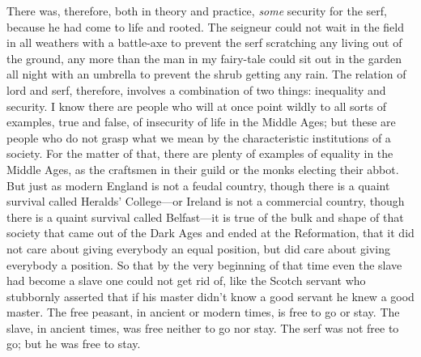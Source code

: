 \documentclass{book}
\begin{document}
There was, therefore, both in theory and practice, \emph{some} security for the serf, because he had come to life and rooted. The seigneur could not wait in the field in all weathers with a battle-axe to prevent the serf scratching any living out of the ground, any more than the man in my fairy-tale could sit out in the garden all night with an umbrella to prevent the shrub getting any rain. The relation of lord and serf, therefore, involves a combination of two things: inequality and security. I know there are people who will at once point wildly to all sorts of examples, true and false, of insecurity of life in the Middle Ages; but these are people who do not grasp what we mean by the characteristic institutions of a society. For the matter of that, there are plenty of examples of equality in the Middle Ages, as the craftsmen in their guild or the monks electing their abbot. But just as modern England is not a feudal country, though there is a quaint survival called Heralds’ College—or Ireland is not a commercial country, though there is a quaint survival called Belfast—it is true of the bulk and shape of that society that came out of the Dark Ages and ended at the Reformation, that it did not care about giving everybody an equal position, but did care about giving everybody a position. So that by the very beginning of that time even the slave had become a slave one could not get rid of, like the Scotch servant who stubbornly asserted that if his master didn’t know a good servant he knew a good master. The free peasant, in ancient or modern times, is free to go or stay. The slave, in ancient times, was free neither to go nor stay. The serf was not free to go; but he was free to stay.
\end{document}
